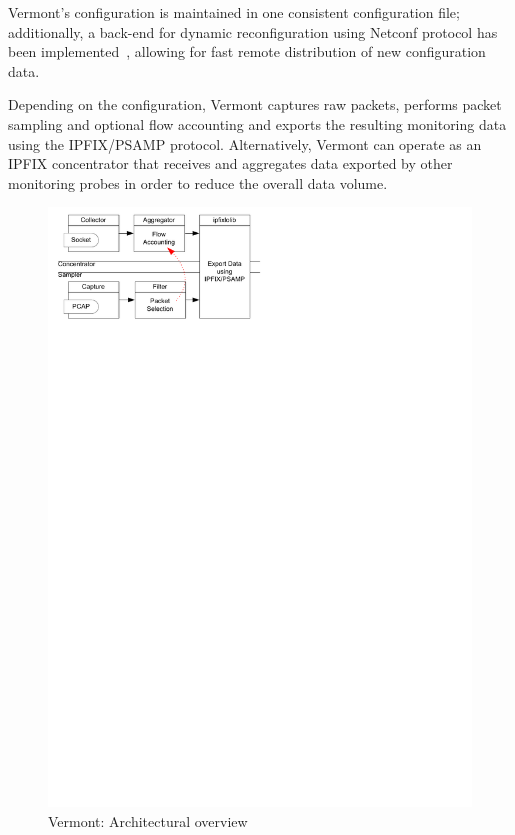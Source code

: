 Vermont's configuration is maintained in one consistent configuration file; additionally, a back-end for dynamic reconfiguration using Netconf protocol has been implemented~\cite{muenz2006using}, allowing for fast remote distribution of new configuration data.

Depending on the configuration, Vermont captures raw packets, performs packet sampling and optional flow accounting and exports the resulting monitoring data using the IPFIX/PSAMP protocol.
Alternatively, Vermont can operate as an IPFIX concentrator that receives and aggregates data exported by other monitoring probes in order to reduce the overall data volume.


\begin{figure}
\begin{center}
\includegraphics[scale=0.65]{gfx/vermont-arch2.pdf}
\caption{Vermont: Architectural overview}
\label{fig_allmodules}
\end{center}
\end{figure}


